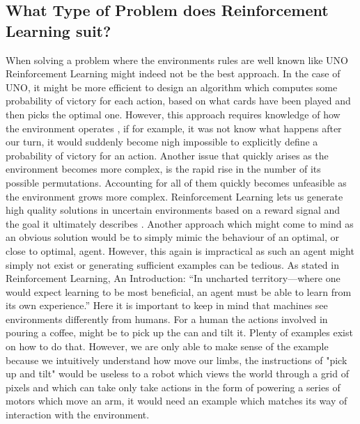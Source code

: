 \subsection{What Type of Problem does Reinforcement Learning suit?}\label{subsec:Why_RL}
When solving a problem where the environments rules are well known like UNO Reinforcement Learning might indeed not be the best approach. In the case of UNO, it might be more efficient to design an algorithm which computes some probability of victory for each action, based on what cards have been played and then picks the optimal one. However, this approach requires knowledge of how the environment operates \cite[p. 8]{sutton_reinforcement_2018}, if for example, it was not know what happens after our turn, it would suddenly become nigh impossible to explicitly define a probability of victory for an action. Another issue that quickly arises as the environment becomes more complex, is the rapid rise in the number of its possible permutations. Accounting for all of them quickly becomes unfeasible as the environment grows more complex. Reinforcement Learning lets us generate high quality solutions in uncertain environments based on a reward signal and the goal it ultimately describes \cite[p. 03]{sutton_reinforcement_2018}. 
\noindent
Another approach which might come to mind as an obvious solution would be to simply mimic the behaviour of an optimal, or close to optimal, agent. However, this again is impractical as such an agent might simply not exist or generating sufficient examples can be tedious. As stated in Reinforcement Learning, An Introduction: “In uncharted territory—where one would expect learning to be most beneficial, an agent must be able to learn from its own experience.” \cite[p. 02]{sutton_reinforcement_2018} Here it is important to keep in mind that machines see environments differently from humans. For a human the actions involved in pouring a coffee, might be to pick up the can and tilt it. Plenty of examples exist on how to do that. However, we are only able to make sense of the example because we intuitively understand how move our limbs, the instructions of "pick up and tilt" would be useless to a robot which views the world through a grid of pixels and which can take only take actions in the form of powering a series of motors which move an arm, it would need an example which matches its way of interaction with the environment.

